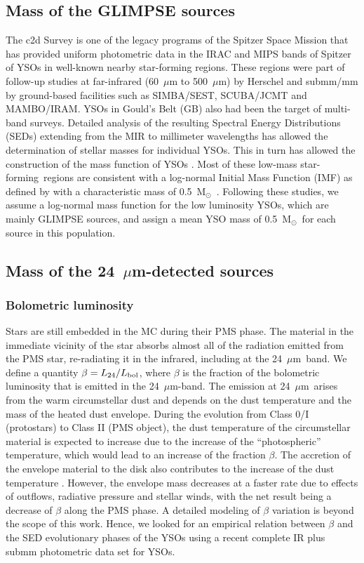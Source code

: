 \documentclass[iop]{emulateapj}
\newcommand{\mum}{$\mu$m}
\newcommand{\msun}{M$_{\odot}$}
\newcommand{\starf}{star-forming}
\newcommand{\mipslam}{24~$\mu$m}
\begin{document}
\subsection{Mass of the GLIMPSE sources}

The c2d Survey \citep{evans+03} is one of the legacy programs of the Spitzer 
Space Mission that has provided uniform photometric data in the IRAC and MIPS 
bands of Spitzer of YSOs in well-known nearby star-forming regions. 
These regions were part of follow-up studies at far-infrared 
(60~$\mu$m to 500~$\mu$m) by Herschel and submm/mm by 
ground-based facilities such as SIMBA/SEST, SCUBA/JCMT and MAMBO/IRAM. 
YSOs in Gould's Belt (GB) also had been the target of multi-band surveys.
Detailed analysis of the resulting
Spectral Energy Distributions (SEDs) extending from the MIR to 
millimeter wavelengths has allowed the determination of stellar 
masses for individual YSOs. This in turn has allowed the 
construction of the mass function of YSOs \citep[e.g.][]{enoch+06,andre+10}.
Most of these low-mass \starf~regions are consistent with a 
log-normal Initial Mass Function (IMF) 
as defined by \citet{chabrier03} with a characteristic mass of 
0.5~\msun~\citep{kennicutt+12}. Following these 
studies, we assume a log-normal mass function for the low luminosity 
YSOs, which are mainly GLIMPSE sources, and assign a mean YSO mass of 
0.5~\msun ~for each source in this population.

\subsection{Mass of the \mipslam-detected sources}

\subsubsection{Bolometric luminosity}

Stars are still embedded in the MC during their PMS phase. The material 
in the immediate vicinity of the star absorbs almost all of the radiation 
emitted from the PMS star, re-radiating it in the infrared, including at 
the 24~\mum\ band. We define a quantity $\beta=L_{24}/L_{\rm bol}$, 
where $\beta$ is the fraction of the bolometric luminosity that is emitted in the 
24~\mum-band. The emission at 24~\mum\ arises from the warm 
circumstellar dust and depends on the dust temperature and the
mass of the heated dust envelope. During the evolution from Class 0/I
(protostars) to Class II (PMS object), the dust temperature of the
circumstellar material is expected to increase due to the increase
of the ``photospheric'' temperature,
which would lead to an increase of the fraction $\beta$.
The accretion of the envelope material to the disk also contributes
to the increase of the dust temperature \citep{stahler+05}. However,
the envelope mass decreases at a faster rate due to effects of outflows, 
radiative pressure and stellar winds, with the net result being a decrease 
of $\beta$ along the PMS phase. A detailed modeling of $\beta$ 
variation is beyond the scope of this work. Hence, we looked for an 
empirical relation between $\beta$ and the SED evolutionary phases 
of the YSOs using a recent complete IR plus submm photometric data set 
for YSOs.
\end{document}
